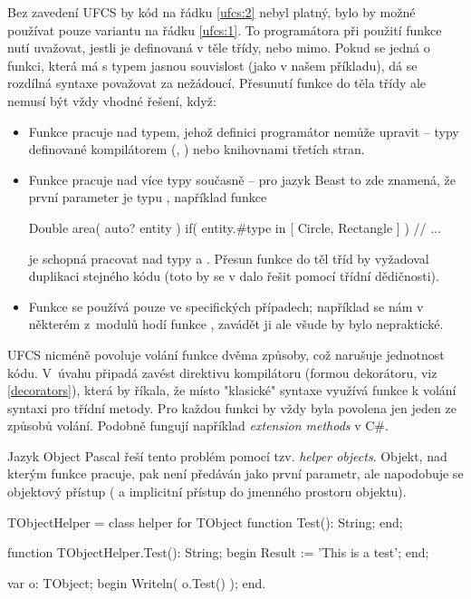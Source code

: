 Bez zavedení UFCS by kód na řádku \ref{ufcs:2} nebyl platný, bylo by možné používat pouze variantu na řádku \ref{ufcs:1}. To programátora při použití funkce nutí uvažovat, jestli je definovaná v těle třídy, nebo mimo. Pokud se jedná o funkci, která má s typem jasnou souvislost (jako v našem příkladu), dá se rozdílná syntaxe považovat za nežádoucí. Přesunutí funkce do těla třídy ale nemusí být vždy vhodné řešení, když:
\begin{itemize}
	\item Funkce pracuje nad typem, jehož definici programátor nemůže upravit -- typy definované kompilátorem (, ) nebo knihovnami třetích stran.
	\item Funkce pracuje nad více typy současně --  pro jazyk Beast to zde znamená, že první parameter je typu , například funkce
		\begin{code}
Double area( auto? entity )
	if( entity.#type in [ Circle, Rectangle ] )
{
	// ...
}
		\end{code}
		je schopná pracovat nad typy  a . Přesun funkce do těl tříd by vyžadoval duplikaci stejného kódu (toto by se v dalo řešit pomocí třídní dědičnosti).
	\item Funkce se používá pouze ve specifických případech; například se nám v některém z~modulů hodí funkce , zavádět ji ale všude by bylo nepraktické.
\end{itemize}

UFCS nicméně povoluje volání funkce dvěma způsoby, což narušuje jednotnost kódu. V~úvahu připadá zavést direktivu kompilátoru (formou dekorátoru, viz \autoref{decorators}), která by říkala, že místo "klasické" syntaxe využívá funkce k volání syntaxi pro třídní metody. Pro každou funkci by vždy byla povolena jen jeden ze způsobů volání. Podobně fungují například \textit{extension methods} v C\#.

Jazyk Object Pascal řeší tento problém pomocí tzv. \textit{helper objects}. Objekt, nad kterým funkce pracuje, pak není předáván jako první parametr, ale napodobuje se objektový přístup ( a implicitní přístup do jmenného prostoru objektu).
\begin{pascalcode}
TObjectHelper = class helper for TObject
	function Test(): String;
end;

function TObjectHelper.Test(): String;
begin
	Result := 'This is a test';
end;

var
	o: TObject;
begin
	Writeln( o.Test() );
end.
\end{pascalcode}

